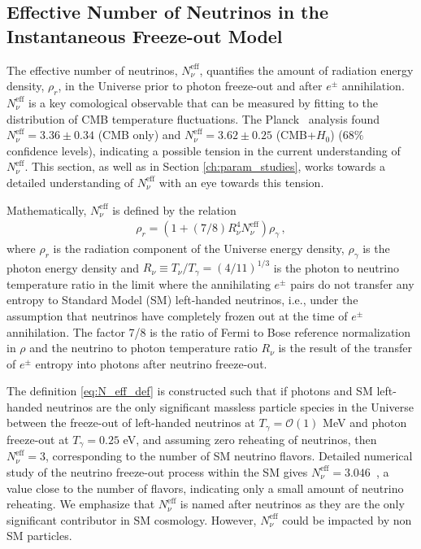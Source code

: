 \subsection{Effective Number of Neutrinos  in the Instantaneous  Freeze-out Model}\label{ch:model_ind}

The effective number of neutrinos, $N^{\text{eff}}_\nu$, quantifies the amount of radiation energy density, $\rho_r$, in the Universe prior to photon freeze-out and after $e^\pm$ annihilation.  $N^{\text{eff}}_\nu$ is a key comological observable that can be  measured by fitting to the distribution of CMB temperature fluctuations. The  Planck~\cite{Planck:2013pxb}  analysis found $N^{\text{eff}}_{\nu}=3.36\pm 0.34$ (CMB only) and $N^{\text{eff}}_{\nu}=3.62\pm 0.25$ (CMB+$H_0$) ($68\%$ confidence levels), indicating a possible tension in the current understanding of $N^{\text{eff}}_\nu$.   This section, as well as in Section \ref{ch:param_studies}, works towards a detailed understanding of $N^{\text{eff}}_{\nu}$ with an eye towards this tension.

Mathematically, $N^{\text{eff}}_\nu$ is defined by the relation
\begin{align}\label{eq:N_eff_def}
\rho_r=\left(1+(7/8)R_\nu^{4}N^{\text{eff}}_\nu\right)\rho_\gamma\,,
\end{align}
where $\rho_r$ is the radiation component of the Universe  energy density, $\rho_\gamma$ is the photon energy density and  $R_\nu\equiv T_\nu/T_\gamma=({4}/{11})^{1/3}$ is the photon to neutrino temperature ratio in the limit where  the annihilating $e^\pm$ pairs do not transfer any entropy  to  Standard Model (SM) left-handed neutrinos, i.e., under the assumption that neutrinos have completely frozen out at the time of $e^\pm$ annihilation.  The factor 7/8 is the ratio of Fermi to Bose reference normalization in $\rho$ and the neutrino to photon temperature ratio $R_\nu$ is the result of the transfer of $e^\pm$ entropy into photons after  neutrino freeze-out.  

The definition \ref{eq:N_eff_def} is constructed such that if photons and SM left-handed neutrinos are the only significant massless particle species in the Universe between the freeze-out of left-handed neutrinos at  $T_\gamma=\mathcal{O}(1)$ MeV and photon freeze-out at $T_\gamma=0.25$ eV, and assuming zero reheating of neutrinos, then $N^{\text{eff}}_{\nu}=3$, corresponding to the number of SM neutrino flavors.  Detailed numerical study of the neutrino freeze-out process within the SM gives $N^{\text{eff}}_{\nu}=3.046$~\cite{Mangano:2005cc}, a value close to the number of flavors, indicating only a small amount of neutrino reheating.  
 We emphasize that $N^{\text{eff}}_\nu$ is named after neutrinos as they are the only significant contributor in SM cosmology. However,   $N^{\text{eff}}_\nu$ could be impacted by non SM particles.

